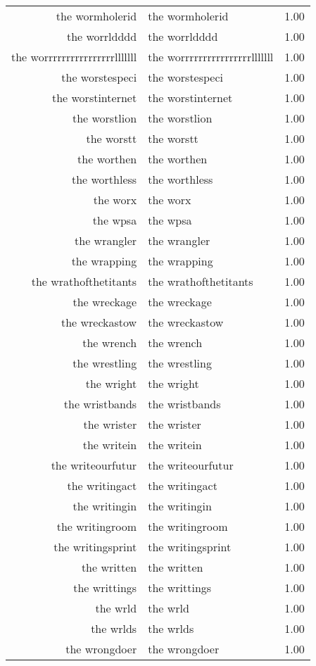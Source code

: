 \begin{table}[ht]
\begin{tabular}{rlr}
  the wormholerid & the wormholerid & 1.00 \\ 
  the worrldddd & the worrldddd & 1.00 \\ 
  the worrrrrrrrrrrrrrrrlllllll & the worrrrrrrrrrrrrrrrlllllll & 1.00 \\ 
  the worstespeci & the worstespeci & 1.00 \\ 
  the worstinternet & the worstinternet & 1.00 \\ 
  the worstlion & the worstlion & 1.00 \\ 
  the worstt & the worstt & 1.00 \\ 
  the worthen & the worthen & 1.00 \\ 
  the worthless & the worthless & 1.00 \\ 
  the worx & the worx & 1.00 \\ 
  the wpsa & the wpsa & 1.00 \\ 
  the wrangler & the wrangler & 1.00 \\ 
  the wrapping & the wrapping & 1.00 \\ 
  the wrathofthetitants & the wrathofthetitants & 1.00 \\ 
  the wreckage & the wreckage & 1.00 \\ 
  the wreckastow & the wreckastow & 1.00 \\ 
  the wrench & the wrench & 1.00 \\ 
  the wrestling & the wrestling & 1.00 \\ 
  the wright & the wright & 1.00 \\ 
  the wristbands & the wristbands & 1.00 \\ 
  the wrister & the wrister & 1.00 \\ 
  the writein & the writein & 1.00 \\ 
  the writeourfutur & the writeourfutur & 1.00 \\ 
  the writingact & the writingact & 1.00 \\ 
  the writingin & the writingin & 1.00 \\ 
  the writingroom & the writingroom & 1.00 \\ 
  the writingsprint & the writingsprint & 1.00 \\ 
  the written & the written & 1.00 \\ 
  the writtings & the writtings & 1.00 \\ 
  the wrld & the wrld & 1.00 \\ 
  the wrlds & the wrlds & 1.00 \\ 
  the wrongdoer & the wrongdoer & 1.00 \\ 

\end{tabular}
\end{table}
